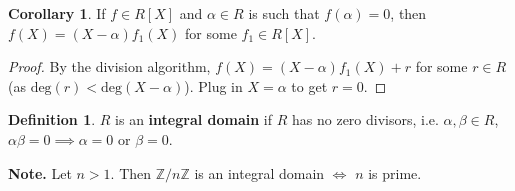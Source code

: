 \documentclass{article}
\theoremstyle{definition}
\newtheorem{cor}[theorem]{Corollary}
\newtheorem{defn}[theorem]{Definition}
\theoremstyle{remark}
\begin{document}
\begin{cor} %
    If $f \in R[X]$ and $\alpha \in R$ is such that $f(\alpha)=0$, then $f(X) = (X-\alpha)f_1(X)$ for some $f_1 \in R[X]$. 
\end{cor}
\begin{proof}
    By the division algorithm, $f(X) = (X-\alpha) f_1(X) + r$ for some $r \in R$ (as $\text{deg}(r) < \text{deg}(X-\alpha)$). Plug in $X=\alpha$ to get $r=0$.
\end{proof}
\begin{defn}
    $R$ is an \textbf{integral domain} if $R$ has no zero divisors, i.e. $\alpha,\beta \in R$, $\alpha \beta=0 \implies \alpha=0$ or $\beta=0$.
\end{defn}
\textbf{Note.} Let $n>1$. Then $\mathbb{Z}/n\mathbb{Z}$ is an integral domain $\iff$ $n$ is prime.
\end{document}
